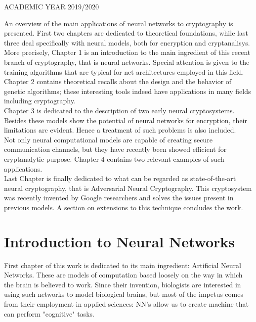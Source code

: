 \documentclass[%
    corpo=11pt,
    twoside,
    stile=classica,
    oldstyle,
    autoretitolo,
    tipotesi=magistrale,
    greek,
    evenboxes,
    english
]{toptesi}
\begin{document}
\vskip 2.5cm


\centerline{ACADEMIC YEAR 2019/2020}






\sommario

An overview of the main applications of neural networks to cryptography is presented. First two chapters are dedicated to 
theoretical foundations, while last three deal specifically with neural models, both for encryption and cryptanalisys. \\
More precisely, Chapter 1 is an introduction to the main ingredient of this recent branch of cryptography, that is neural networks. 
Special attention is given to the training algorithms that are typical for net architectures employed in this field. \\
Chapter 2 contains theoretical recalls about the design and the behavior of genetic algorithms; these interesting tools indeed
have applications in many fields including cryptography. \\
Chapter 3 is dedicated to the description of two early neural cryptosystems. Besides these models show the potential of neural networks
for encryption, their limitations are evident. Hence a treatment of such problems is also included. \\
Not only neural computational models are capable of creating secure communication channels, but they have recently been
showed efficient for cryptanalytic purpose. Chapter 4 contains two relevant examples of such applications. \\
Last Chapter is finally dedicated to what can be regarded as state-of-the-art neural cryptography, that is Adversarial Neural Cryptography. 
This cryptosystem was recently invented by Google researchers and solves the issues present in previous models. A section on extensions to this 
technique concludes the work.   



\tablespagetrue\figurespagetrue %
\indici

\mainmatter

\chapter{Introduction to Neural Networks}
First chapter of this work is dedicated to its main ingredient: Artificial Neural Networks. These are models of computation based loosely on the way in which the brain is believed to work. Since their invention, biologists are interested in using such networks to model biological brains, but most of the impetus comes from their employment in applied sciences: NN's allow us to create machine that can perform "cognitive" tasks.
\end{document}
